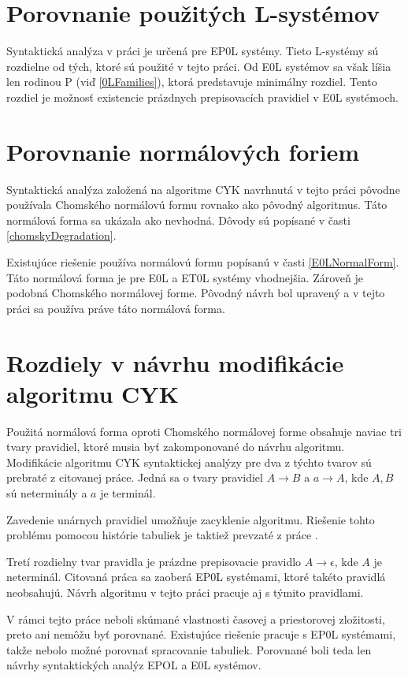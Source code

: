 \section*{Porovnanie použitých L-systémov}
Syntaktická analýza v práci \cite{FITMT21128} je určená pre EP0L systémy. Tieto L-systémy sú rozdielne od tých, ktoré sú použité v tejto práci. Od E0L systémov sa však líšia len rodinou P (viď \ref{0LFamilies}), ktorá predstavuje minimálny rozdiel. Tento rozdiel je možnosť existencie prázdnych prepisovacích pravidiel v E0L systémoch.

\section*{Porovnanie normálových foriem}
Syntaktická analýza založená na algoritme CYK navrhnutá v tejto práci pôvodne používala Chomského normálovú formu rovnako ako pôvodný algoritmus. Táto normálová forma sa ukázala ako nevhodná. Dôvody sú popísané v časti \ref{chomskyDegradation}.

Existujúce riešenie používa normálovú formu popísanú v časti \ref{E0LNormalForm}. Táto normálová forma je pre E0L a ET0L systémy vhodnejšia. Zároveň je podobná Chomského normálovej forme. Pôvodný návrh bol upravený a v tejto práci sa používa práve táto normálová forma.

\section*{Rozdiely v návrhu modifikácie algoritmu CYK}
Použitá normálová forma oproti Chomského normálovej forme obsahuje naviac tri tvary pravidiel, ktoré musia byť zakomponované do návrhu algoritmu. Modifikácie algoritmu CYK syntaktickej analýzy pre dva z týchto tvarov sú prebraté z citovanej práce. Jedná sa o tvary pravidiel $A \to B$ a $a \to A$, kde $A,B$ sú neterminály a $a$ je terminál.

Zavedenie unárnych pravidiel umožňuje zacyklenie algoritmu. Riešenie tohto problému pomocou histórie tabuliek je taktiež prevzaté z práce \cite{FITMT21128}.

Tretí rozdielny tvar pravidla je prázdne prepisovacie pravidlo $A \to \epsilon$, kde $A$ je neterminál. Citovaná práca sa zaoberá EP0L systémami, ktoré takéto pravidlá neobsahujú. Návrh algoritmu v tejto práci pracuje aj s týmito pravidlami.

\bigskip
V rámci tejto práce neboli skúmané vlastnosti časovej a priestorovej zložitosti, preto ani nemôžu byť porovnané. Existujúce riešenie pracuje s EP0L systémami, takže nebolo možné porovnať spracovanie tabuliek. Porovnané boli teda len návrhy syntaktických analýz EPOL a E0L systémov.


